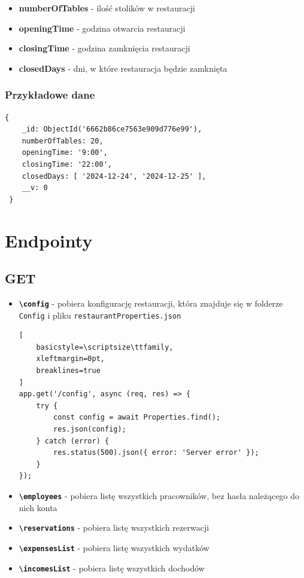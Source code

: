 \documentclass[12pt]{article}
\begin{document}
\begin{itemize}
	\item \textbf{numberOfTables} - ilość stolików w restauracji
	\item \textbf{openingTime} - godzina otwarcia restauracji
	\item \textbf{closingTime} - godzina zamknięcia restauracji
	\item \textbf{closedDays} - dni, w które restauracja będzie zamknięta
\end{itemize}

\subsubsection{Przykładowe dane}
\begin{lstlisting}[]
 {
    _id: ObjectId('6662b86ce7563e909d776e99'),
    numberOfTables: 20,
    openingTime: '9:00',
    closingTime: '22:00',
    closedDays: [ '2024-12-24', '2024-12-25' ],
    __v: 0
 }
\end{lstlisting}

\newpage
\section{Endpointy}
\subsection{GET}
\begin{itemize}
    \item \textbf{\texttt{\textbackslash config}} - pobiera konfigurację restauracji, która znajduje się w folderze \texttt{Config} i pliku \texttt{restaurantProperties.json}
    \begin{lstlisting}[
    basicstyle=\scriptsize\ttfamily,
    xleftmargin=0pt,
    breaklines=true
]
app.get('/config', async (req, res) => {
    try {
        const config = await Properties.find();
        res.json(config);
    } catch (error) {
        res.status(500).json({ error: 'Server error' });
    }
});
\end{lstlisting}
    \item \textbf{\texttt{\textbackslash employees}} - pobiera listę wszystkich pracowników, bez hasła należącego do nich konta
    \item \textbf{\texttt{\textbackslash reservations}} - pobiera listę wszystkich rezerwacji
    \item \textbf{\texttt{\textbackslash expensesList}} - pobiera listę wszystkich wydatków
    \item \textbf{\texttt{\textbackslash incomesList}} - pobiera listę wszystkich dochodów
\end{itemize}
\end{document}
